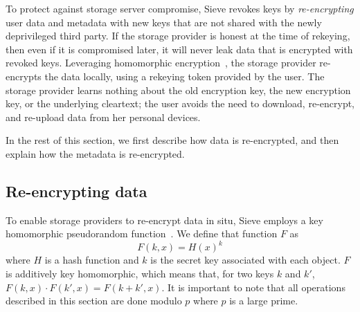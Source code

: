To protect against storage server compromise,
Sieve revokes keys by \emph{re-encrypting}
user data and metadata with new keys that
are not shared with the newly deprivileged
third party. If the storage provider is
honest at the time of rekeying, then even
if it is compromised later, it will never
leak data that is encrypted with revoked
keys.
Leveraging homomorphic encryption~\cite{gentry},
the storage provider re-encrypts the data
locally, using a rekeying token provided
by the user. The storage provider learns
nothing about the old encryption key, the
new encryption key, or the underlying cleartext;
the user avoids the need to download, re-encrypt, and 
re-upload data from her personal devices.

In the rest of this section, we first describe
how data is re-encrypted, and then explain how
the metadata is re-encrypted.

\subsection{Re-encrypting data} 
To enable storage providers to re-encrypt data in situ, 
Sieve employs a key homomorphic pseudorandom
function~\cite{keyhom, npr99}. We
define that function $F$ as
  \begin{equation*}
    F(k, x) = H(x)^k 
  \end{equation*}
where $H$ is a hash function and $k$ is the
secret key associated with each object. $F$
is additively key homomorphic, which means
that, for two keys $k$ and $k'$,
$F(k,x) \cdot F(k',x) = F(k+k',x)$. It is important
to note that all operations described in this section
are done modulo $p$ where $p$ is a large prime.

